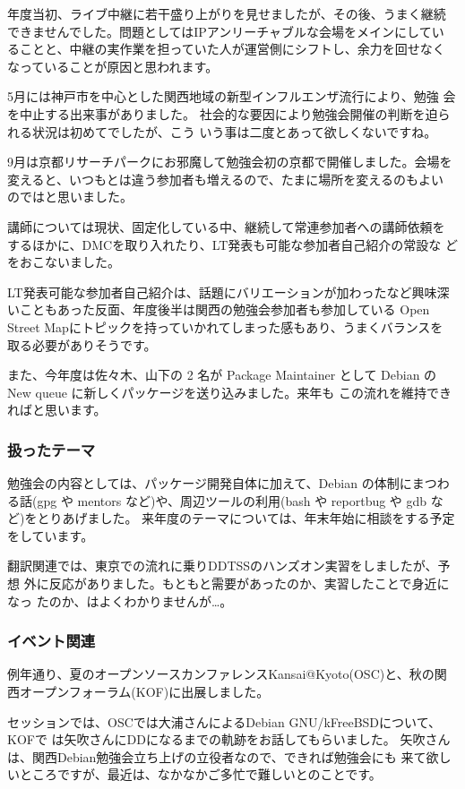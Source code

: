 \documentclass[mingoth,a4paper]{jsarticle}
\begin{document}
年度当初、ライブ中継に若干盛り上がりを見せましたが、その後、うまく継続
できませんでした。問題としてはIPアンリーチャブルな会場をメインにしてい
ることと、中継の実作業を担っていた人が運営側にシフトし、余力を回せなく
なっていることが原因と思われます。

5月には神戸市を中心とした関西地域の新型インフルエンザ流行により、勉強
会を中止する出来事がありました。
社会的な要因により勉強会開催の判断を迫られる状況は初めてでしたが、こう
いう事は二度とあって欲しくないですね。

9月は京都リサーチパークにお邪魔して勉強会初の京都で開催しました。会場を
変えると、いつもとは違う参加者も増えるので、たまに場所を変えるのもよい
のではと思いました。

講師については現状、固定化している中、継続して常連参加者への講師依頼を
するほかに、DMCを取り入れたり、LT発表も可能な参加者自己紹介の常設な
どをおこないました。

LT発表可能な参加者自己紹介は、話題にバリエーションが加わったなど興味深
いこともあった反面、年度後半は関西の勉強会参加者も参加している Open
Street Mapにトピックを持っていかれてしまった感もあり、うまくバランスを
取る必要がありそうです。

また、今年度は佐々木、山下の 2 名が Package Maintainer として
Debian の New queue に新しくパッケージを送り込みました。来年も
この流れを維持できればと思います。

\subsubsection{扱ったテーマ}

勉強会の内容としては、パッケージ開発自体に加えて、Debian の体制にまつわ
る話(gpg や mentors など)や、周辺ツールの利用(bash や reportbug や gdb
など)をとりあげました。
来年度のテーマについては、年末年始に相談をする予定をしています。

翻訳関連では、東京での流れに乗りDDTSSのハンズオン実習をしましたが、予想
外に反応がありました。もともと需要があったのか、実習したことで身近になっ
たのか、はよくわかりませんが…。

\subsubsection{イベント関連}
例年通り、夏のオープンソースカンファレンスKansai@Kyoto(OSC)と、秋の関
西オープンフォーラム(KOF)に出展しました。

セッションでは、OSCでは大浦さんによるDebian GNU/kFreeBSDについて、KOFで
は矢吹さんにDDになるまでの軌跡をお話してもらいました。
矢吹さんは、関西Debian勉強会立ち上げの立役者なので、できれば勉強会にも
来て欲しいところですが、最近は、なかなかご多忙で難しいとのことです。
\end{document}
